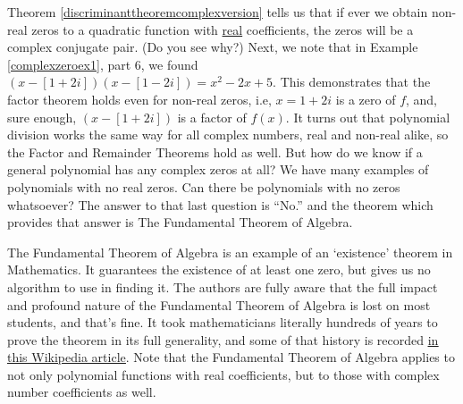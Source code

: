 \medskip

Theorem \ref{discriminanttheoremcomplexversion} tells us that if ever we obtain non-real zeros to a quadratic function with \underline{real} coefficients, the zeros  will be a complex conjugate pair. (Do you see why?)  Next, we note that in Example \ref{complexzeroex1}, part 6, we found $(x-[1+2i])(x-[1-2i])=x^2-2x+5$.  This demonstrates that the factor theorem holds even for non-real zeros, i.e,  $x=1+2i$ is a zero of $f$, and, sure enough, $(x-[1+2i])$ is a factor of $f(x)$.  It turns out that polynomial division works the same way for all complex numbers, real and non-real alike, so the Factor and Remainder Theorems hold as well.  But how do we know if a general polynomial has any complex zeros at all?  We have many examples of polynomials with no real zeros.  Can there be polynomials with no zeros whatsoever?  The answer to that last question is ``No.'' and the theorem which provides that answer is  The Fundamental Theorem of Algebra.

\medskip


\medskip

The Fundamental Theorem of Algebra is an example of an `existence' theorem in Mathematics.  It  guarantees the existence of at least one zero, but gives us no algorithm to use in finding it.  The authors are fully aware that the full impact and profound nature of the Fundamental Theorem of Algebra  is lost on most students, and that's fine.  It took mathematicians literally hundreds of years to prove the theorem in its full generality, and some of that history is recorded \href{http://en.wikipedia.org/wiki/Fundamental_theorem_of_algebra}{\underline{in this Wikipedia article}}.  Note that the Fundamental Theorem of Algebra  applies to not only polynomial functions with real coefficients, but to those with complex number coefficients as well.  



